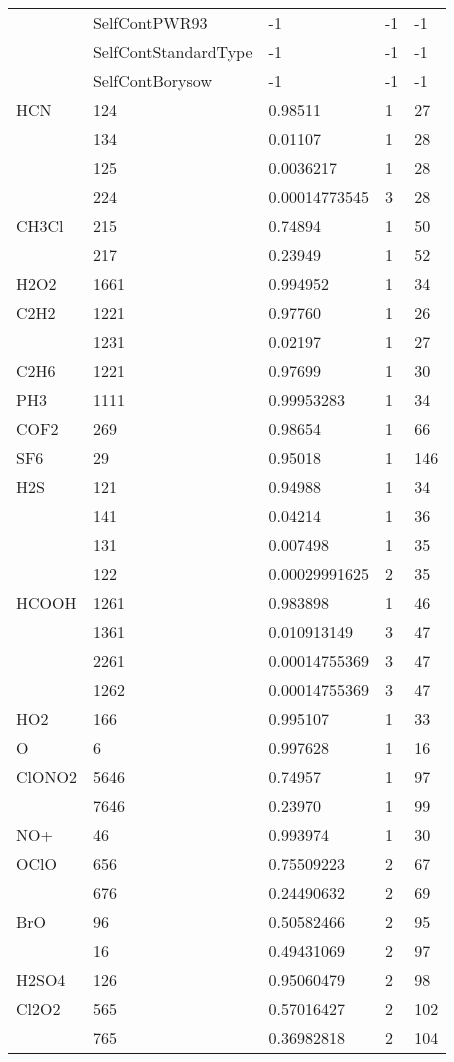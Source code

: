 \begin{longtable}{lllll}
    &SelfContPWR93&             -1      &-1     &-1\\
    &SelfContStandardType&      -1      &-1     &-1\\
    &SelfContBorysow&           -1      &-1     &-1\\
\hline                  
  HCN& 124&  0.98511&  1&27\\
     & 134&  0.01107&  1&28\\
     & 125&  0.0036217&  1&28\\
     & 224&  0.00014773545&  3&28\\
\hline                  
  CH3Cl& 215&  0.74894&  1&50\\
       & 217&  0.23949&  1&52\\
\hline                  
  H2O2& 1661&  0.994952&  1&34\\
\hline                  
  C2H2& 1221&  0.97760&  1&26\\
      & 1231&  0.02197&  1&27\\
\hline                  
  C2H6& 1221&  0.97699&  1&30\\
\hline
  PH3& 1111&  0.99953283&  1&34\\
\hline                  
  COF2& 269&  0.98654&  1&66\\
\hline                  
  SF6& 29&  0.95018&  1&146\\
\hline                  
  H2S& 121&  0.94988&  1&34\\
     & 141&  0.04214&  1&36\\
     & 131&  0.007498&  1&35\\
     & 122&  0.00029991625&  2&35\\
\hline                  
  HCOOH& 1261&  0.983898&  1&46\\
       & 1361&  0.010913149&  3&47\\
       & 2261&  0.00014755369&  3&47\\
       & 1262&  0.00014755369&  3&47\\
\hline                  
  HO2& 166&  0.995107&  1&33\\
\hline                  
  O& 6&  0.997628&  1&16\\
\hline                  
  ClONO2& 5646&  0.74957&  1&97\\
        & 7646&  0.23970&  1&99\\
\hline                  
  NO+& 46&  0.993974&  1&30\\
\hline                  
  OClO& 656&  0.75509223&  2&67\\
      & 676&  0.24490632&  2&69\\
\hline                  
  BrO& 96&  0.50582466&  2&95\\
     & 16&  0.49431069&  2&97\\
\hline                  
  H2SO4& 126&  0.95060479&  2&98\\
\hline                  
  Cl2O2& 565&  0.57016427&  2&102\\
       & 765&  0.36982818&  2&104\\

\end{longtable}



